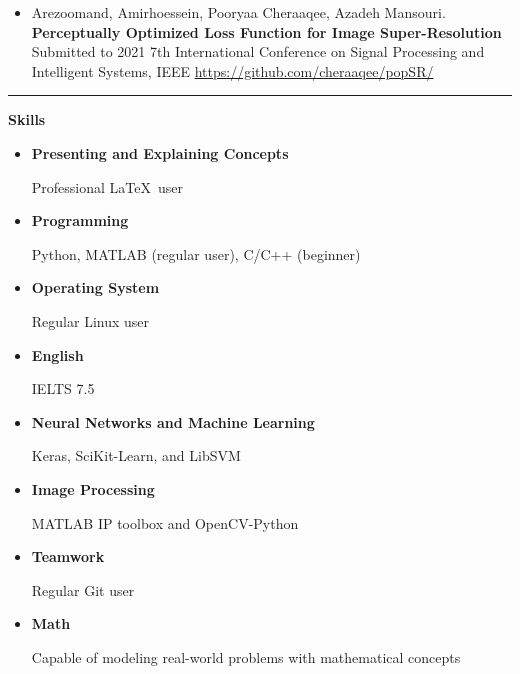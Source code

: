 \documentclass{letter}
\begin{document}
\begin{multicols}{2}
\begin{itemize}
		\item Arezoomand, Amirhoessein, Pooryaa Cheraaqee, Azadeh Mansouri. \textbf{Perceptually Optimized Loss Function for Image Super-Resolution} Submitted to 2021 7th International Conference on Signal Processing and Intelligent Systems, IEEE \href{https://github.com/cheraaqee/popSR/}{https://github.com/cheraaqee/popSR/}
	\end{itemize}
\noindent \rule{\columnwidth}{2pt}

\begin{Large}
	\textbf{Skills}
\end{Large}
	\begin{itemize}
		\item \textbf{Presenting and Explaining Concepts}

			Professional \LaTeX~user

		\item \textbf{Programming}

Python, MATLAB (regular user), C/C++ (beginner)

\item{\textbf{Operating System}}

Regular Linux user

\item \textbf{English}

IELTS 7.5
\item \textbf{Neural Networks and Machine Learning}

Keras, SciKit-Learn,  and LibSVM

\item \textbf{Image Processing}

MATLAB IP toolbox and OpenCV-Python

\item \textbf{Teamwork}

Regular Git user

\item \textbf{Math}

Capable of modeling real-world problems with mathematical concepts
	\end{itemize}


\end{multicols}
\end{document}
